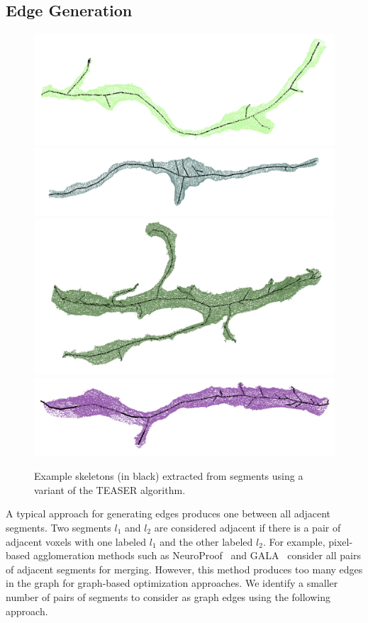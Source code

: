 \subsection{Edge Generation}

\begin{figure}[t]
	\centering
	\includegraphics[width=0.45\linewidth]{./figures/skeleton1.png}
	\includegraphics[width=0.45\linewidth]{./figures/skeleton2.png}
	\includegraphics[width=0.45\linewidth]{./figures/skeleton3.png}
	\includegraphics[width=0.45\linewidth]{./figures/skeleton4.png}
	\caption{Example skeletons (in black) extracted from segments using a variant of the TEASER algorithm.}
	\label{fig:skeletonization}
\end{figure}

A typical approach for generating edges produces one between all adjacent segments. Two segments $l_1$ and $l_2$ are considered adjacent if there is a pair of adjacent voxels with one labeled $l_1$ and the other labeled $l_2$.
For example, pixel-based agglomeration methods such as NeuroProof~\cite{10.1371/journal.pone.0125825} and GALA~\cite{nunez2014graph} consider all pairs of adjacent segments for merging.
However, this method produces too many edges in the graph for graph-based optimization approaches. 
We identify a smaller number of pairs of segments to consider as graph edges using the following approach.


